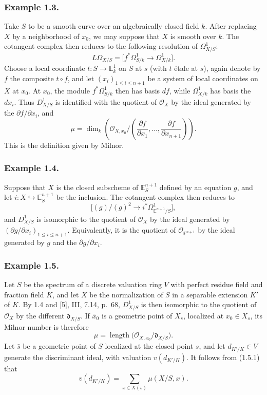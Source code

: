 \subsubsection*{Example 1.3.}
Take $S$ to be a smooth curve over an algebraically closed field
$k$.  After replacing $X$ by a neighborhood of $x_0$, we may suppose
that $X$ is smooth over $k$.  The cotangent complex then reduces to
the following resolution of $\Omega^1_{X/S}$:
\[
L\Omega_{X/S}
=\bigl[f^*\Omega^1_{S/k}\longrightarrow\Omega^1_{X/k}\bigr].
\]
Choose a local coordinate $t:S\to\mathbb E^1_k$ on $S$ at $s$
(with $t$ \'etale at $s$), again denote by $f$ the composite
$t\circ f$, and let $(x_i)_{1\le i\le n+1}$ be a system of local
coordinates on $X$ at $x_0$.  At $x_0$, the module
$f^*\Omega^1_{S/k}$ then has basis $df$, while $\Omega^1_{X/k}$ has
basis the $dx_i$.  Thus $D^1_{X/S}$ is identified with the quotient
of $\mathcal O_X$ by the ideal generated by the
$\partial f/\partial x_i$, and
\begin{equation}\tag{1.3.1}
\mu=\dim_k\!\left(
\mathcal O_{X,x_0}/
\left(\frac{\partial f}{\partial x_1},\ldots,
      \frac{\partial f}{\partial x_{n+1}}\right)\right).
\end{equation}
This is the definition given by Milnor.

\subsubsection*{Example 1.4.}
Suppose that $X$ is the closed subscheme of $\mathbb E^{n+1}_S$
defined by an equation $g$, and let
$i:X\hookrightarrow\mathbb E^{n+1}_S$ be the inclusion.  The
cotangent complex then reduces to
\[
\bigl[(g)/(g)^2\longrightarrow
i^*\Omega^1_{\mathbb E^{n+1}/S}\bigr],
\]
and $D^1_{X/S}$ is isomorphic to the quotient of $\mathcal O_X$ by
the ideal generated by
$(\partial g/\partial x_i)_{1\le i\le n+1}$.  Equivalently, it is
the quotient of $\mathcal O_{\mathbb E^{n+1}}$ by the ideal generated
by $g$ and the $\partial g/\partial x_i$.

\subsubsection*{Example 1.5.}
Let $S$ be the spectrum of a discrete valuation ring $V$ with
perfect residue field and fraction field $K$, and let $X$ be the
normalization of $S$ in a separable extension $K'$ of $K$.  By 1.4
and [5], III, 7.14, p.~68, $D^1_{X/S}$ is then isomorphic to the
quotient of $\mathcal O_X$ by the different $\mathfrak d_{X/S}$.  If
$\bar x_0$ is a geometric point of $X_s$, localized at
$x_0\in X_s$, its Milnor number is therefore
\begin{equation}\tag{1.5.1}
\mu=\operatorname{length}
\bigl(\mathcal O_{X,x_0}/\mathfrak d_{X/S}\bigr).
\end{equation}
Let $\bar s$ be a geometric point of $S$ localized at the closed
point $s$, and let $d_{K'/K}\in V$ generate the discriminant ideal,
with valuation $v(d_{K'/K})$.  It follows from (1.5.1) that
\begin{equation}\tag{1.5.2}
v(d_{K'/K})=\sum_{x\in X(\bar s)}\mu(X/S,x).
\end{equation}
